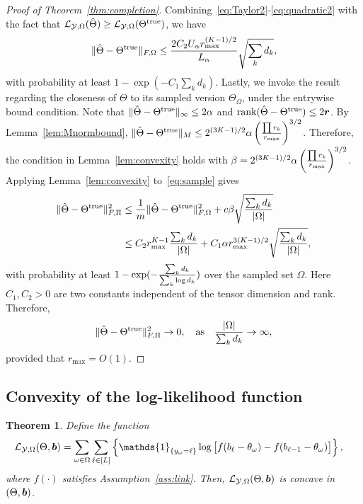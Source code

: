 \documentclass{article}
\theoremstyle{plain}
\newtheorem{thm}{Theorem}[section]
\theoremstyle{definition}
\begin{document}
\begin{proof}[Proof of Theorem~\ref{thm:completion}]
Combining~\eqref{eq:Taylor2}-\eqref{eq:quadratic2} with the fact that $\mathcal{L}_{\mathcal{Y},\Omega}(\hat \Theta)\geq \mathcal{L}_{\mathcal{Y},\Omega}(\Theta^{\text{true}})$, we have
\begin{equation}\label{eq:sample}
\lVert\hat \Theta-\Theta^{\text{true}}\rVert_{F,\Omega}\leq {2C_2U_\alpha  r_{\max}^{(K-1)/2} \over L_\alpha} \sqrt{\sum_kd_k},
\end{equation}
with probability at least $1-\exp(-C_1 \sum_k d_k)$. Lastly, we invoke the result regarding the closeness of $\Theta$ to its sampled version $\Theta_{\Omega}$, under the entrywise bound condition. Note that $\lVert\hat\Theta-\Theta^{\text{true}}\rVert_\infty\leq 2\alpha$ and $\text{rank}(\hat \Theta-\Theta^{\text{true}})\leq 2\bm{r}$. By Lemma~\ref{lem:Mnormbound}, $\lVert\hat \Theta-\Theta^{\text{true}}\rVert_M\leq 2^{(3K-1)/2} \alpha \left({\prod r_k \over r_{\max}}\right)^{3/2}$. Therefore, the condition in Lemma~\ref{lem:convexity} holds with $\beta=2^{(3K-1)/2}\alpha \left({\prod r_k \over r_{\max}}\right)^{3/2}$.
Applying Lemma~\ref{lem:convexity} to~\eqref{eq:sample} gives
\begin{align}
 \lVert\hat \Theta-\Theta^{\text{true}}\rVert_{F,\Pi}^2&\leq {1\over m}\lVert\hat \Theta-\Theta^{\text{true}}\rVert_{F,\Omega}^2+c\beta\sqrt{\sum_k d_k\over |\Omega|}\\
 &\leq {C_2  r^{K-1}_{\max}} {\sum_k d_k \over |\Omega|}+C_1 \alpha r_{\max}^{3(K-1)/2}\sqrt{\sum_kd_k\over |\Omega|},
\end{align}
with probability at least $1-\exp(-{\sum_kd_k\over \sum_k \log d_k})$ over the sampled set $\Omega$. Here $C_1, C_2>0$ are two constants independent of the tensor dimension and rank. Therefore,
\[
 \lVert\hat \Theta-\Theta^{\text{true}}\rVert_{F,\Pi}^2\to 0,\quad \text{as}\quad {|\Omega|\over \sum_kd_k}\to \infty,
\]
provided that $r_{\max}=O(1)$.
\end{proof}

\subsection{Convexity of the log-likelihood function}\label{sec:proofconvexity}
\begin{thm}\label{thm:convexity}
Define the function
\begin{align}\label{eq:function}
 \logl(\Theta, \mb)&=\sum_{\omega\in\Omega}\sum_{\ell\in[L]} \left\{\mathds{1}_{\{y_\omega=\ell\}} \log \big[f(b_\ell-\theta_\omega)-  f(b_{\ell-1}-\theta_\omega)\big]\right\},
 \end{align}
where $f(\cdot)$ satisfies Assumption~\ref{ass:link}. Then, $\mathcal{L}_{\mathcal{Y},\Omega}(\Theta, \bm{b})$ is concave in $(\Theta,\bm{b})$.
\end{thm}
\end{document}
